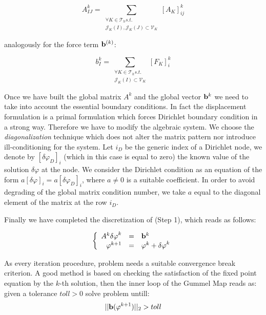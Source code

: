 \begin{equation}
A_{IJ}^k = \sum_{\substack{\forall K \in \mathcal{T}_h s.t. \\ \mathcal{J}_K(I),\mathcal{J}_K(J) \subset \mathcal{V}_K}}
 [A_K]_{ij}^k
\end{equation}

analogously for the force term $\mathbf{b}^{(k)}$:

\begin{equation}
b_{I}^k = \sum_{\substack{\forall K \in \mathcal{T}_h s.t. \\ \mathcal{J}_K(I) \subset \mathcal{V}_K}}
 [F_K]_{i}^k
\end{equation}

Once we have built the global matrix $A^k$ and the global vector $\mathbf{b}^k$ we need to take into account the essential boundary conditions. In fact the displacement formulation is a primal formulation which forces Dirichlet boundary condition in a strong way. Therefore we have to modify the algebraic system. We choose the \textit{diagonalization} technique which does not alter the matrix pattern nor introduce ill-conditioning for the system.  Let $i_D$ be the generic index of a Dirichlet node, we denote by $[\delta \varphi_{D}]_i$ (which in this case is equal to zero) the known value of the solution $\delta \varphi $ at the node. We consider the Dirichlet condition as an equation of the form $a [\delta \varphi]_i = a [\delta \varphi_{D}]_i$, where $a\neq 0$ is a suitable coefficient. In order to avoid degrading of the global matrix condition number, we take $a$ equal to the diagonal element of the matrix at the row  $i_D$.

Finally we have completed the discretization of (Step 1), which reads as follows:

\begin{equation}
\label{eq: NLP discretizated}
\left\{
\begin{array}{rcl}
A^k\mathbf{\delta \varphi}^k & = & \mathbf{b}^k \\
\mathbf{\varphi}^{k+1} & = & \mathbf{\varphi}^k +  \mathbf{\delta \varphi}^k 
\end{array}
\right.
\end{equation}

As every iteration procedure, problem  needs a suitable convergence break criterion. A good method is based on checking the satisfaction of the fixed point equation  by the $k$-th solution, then the inner loop of the Gummel Map reads as: given a tolerance $toll>0$ solve problem  untill:
\begin{equation}
||\mathbf{b}(\varphi^{k+1})||_2 > toll
\end{equation}

